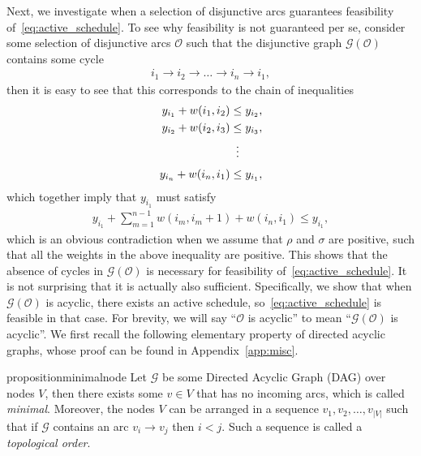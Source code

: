 \documentclass[a4paper]{report}
\theoremstyle{definition}
\theoremstyle{plain}
\begin{document}
Next, we investigate when a selection of disjunctive arcs guarantees
feasibility of~\eqref{eq:active_schedule}.
%
To see why feasibility is not guaranteed per se, consider some selection of
disjunctive arcs $\mathcal{O}$ such that the disjunctive graph $\mathcal{G}(\mathcal{O})$
contains some cycle
\begin{align*}
 i_1 \rightarrow i_2 \rightarrow \dots \rightarrow i_n \rightarrow i_1,
\end{align*}
%
then it is easy to see that this corresponds to the chain of inequalities
\begin{align*}
  y_{i_1} + w(i_1,i_2) &\leq y_{i_2} ,\\
  y_{i_2} + w(i_2,i_3) &\leq y_{i_3} ,\\
  &\vdotswithin{=} \notag \\[0.3em]
  y_{i_n} + w(i_n,i_1) &\leq y_{i_1} ,
\end{align*}
%
which together imply that $y_{i_1}$ must satisfy
\begin{align*}
  y_{i_1} + \sum_{m=1}^{n-1} w(i_m, i_m+1) + w(i_n, i_1) \leq y_{i_1} ,
\end{align*}
which is an obvious contradiction when we assume that $\rho$
and $\sigma$ are positive, such that all the weights in the above
inequality are positive.
%
This shows that the absence of cycles in $\mathcal{G}(\mathcal{O})$ is necessary
for feasibility of~\eqref{eq:active_schedule}. It is not surprising that it is actually also
sufficient.
%
Specifically, we show that when $\mathcal{G}(\mathcal{O})$ is acyclic, there exists an
active schedule, so~\eqref{eq:active_schedule} is feasible in that case.
%
For brevity, we will say ``$\mathcal{O}$ is acyclic'' to mean ``$\mathcal{G}(\mathcal{O})$
is acyclic''.
%
We first recall the following elementary property of directed acyclic graphs,
whose proof can be found in Appendix~\ref{app:misc}.

\begin{restatable}{proposition}{minimalnode}\label{lemma:minimal-node}
  Let $\mathcal{G}$ be some Directed Acyclic Graph (DAG) over nodes $V$, then
  there exists some $v \in V$ that has no incoming arcs, which is called
  \emph{minimal}. Moreover, the nodes $V$ can be arranged in a sequence
  $v_1, v_2, \dots, v_{|V|}$ such that if $\mathcal{G}$ contains an arc
  $v_i \rightarrow v_j$ then $i < j$. Such a sequence is called a
  \emph{topological order}.
\end{restatable}
\end{document}
